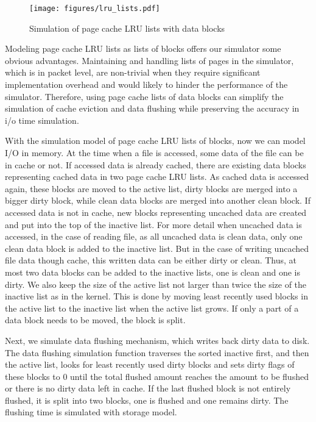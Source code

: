 \documentclass[conference]{IEEEtran}
\begin{document}
			\begin{figure}
   				\centering
   				\texttt{[image: figures/lru\_lists.pdf]}
   				\caption{Simulation of page cache LRU lists with data blocks}\label{fig:lrulist}
			\end{figure}	
			
			Modeling page cache LRU lists as lists of blocks offers our simulator 
			some obvious advantages. 
			Maintaining and handling lists of pages in the simulator, which is in 
			packet level, are non-trivial when they require significant implementation 
			overhead and would likely to hinder the performance of the simulator. 
			Therefore, using page cache lists of data blocks can simplify the 
			simulation of cache eviction and data flushing while preserving
			the accuracy in i/o time simulation. 
			
			With the simulation model of page cache LRU lists of blocks, now we can 
			model I/O in memory.
			At the time when a file is accessed, some data of the file can be in 
			cache or not. 
			If accessed data is already cached, there are existing data blocks 
			representing cached data in two page cache LRU lists. 
			As cached data is accessed again, these blocks are moved to 
			the active list, dirty blocks are merged into a bigger dirty block, 
			while clean data blocks are merged into another clean block. 
			If accessed data is not in cache, new blocks representing uncached data 
			are created and put into the top of the inactive list. 
			For more detail when uncached data is accessed, in the case of 
			reading file, as all uncached data is clean data, only one clean data 
			block is added to the inactive list.
			But in the case of writing uncached file data though cache, 
			this written data can be either dirty or clean. 
			Thus, at most two data blocks can be added to the inactive lists, 
			one is clean and one is dirty. 
			We also keep the size of the active list not larger than twice the size of 
			the inactive list as in the kernel. This is done by moving least recently 
			used blocks in the active list to the inactive list when the active list 
			grows. If only a part of a data block needs to be moved, 
			the block is split.

			Next, we simulate data flushing mechanism, which writes back 
			dirty data to disk. 
			The data flushing simulation function traverses the sorted inactive first, 
			and then the active list, looks for least recently used dirty blocks and 
			sets dirty flags of these blocks to 0 until the total flushed amount 
			reaches the amount to be flushed or there is no dirty data left in cache. 
			If the last flushed block is not entirely flushed, it is split into 
			two blocks, one is flushed and one remains dirty.
			The flushing time is simulated with storage model.
			
\end{document}
